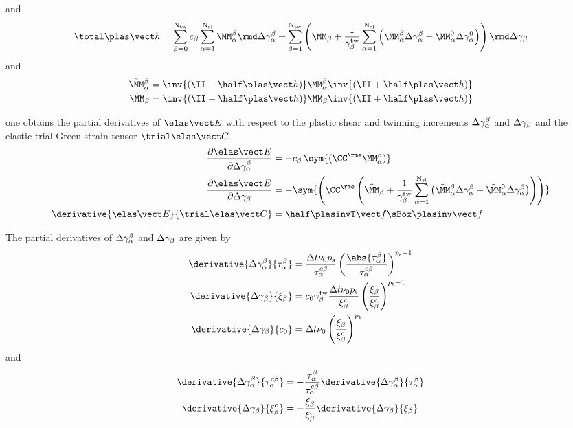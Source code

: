   and
  \begin{equation}
      \dhhp =  \sumbO \cb \sumaI \MMab \rmd \Delta \gammaab + \sumbI \left(\MMb + \frac{1}{\gammatwb}\sumaI\left(\MMab\Delta\gammaab-\MMaO\Delta\gammaaO\right)\right)  \rmd \Delta \gammab
      \label{eq:dhhp}
  \end{equation}
  and 
  \begin{equation}
    \begin{split}
      \MMabtilde = \inv{\IIminus} \MMab \inv{\IIplus} \\
      \MMbtilde = \inv{\IIminus} \MMb \inv{\IIplus}
    \end{split}
  \end{equation}
  
  one obtains the partial derivatives of $\EEe$ with respect to the plastic shear and twinning increments $\Delta\gamma^{\beta}_{\alpha}$ and $\Delta\gamma_{\beta}$ and the elastic trial Green strain tensor $\CCetr$
  \begin{align}
    \dEEeDDeltagammaab &= - \cb \, \sym{(\CCe \MMabtilde)} \label{eq:dEEeDDeltagammaab}\\
    \dEEeDDeltagammab &= - \sym{\left(\CCe \left(\MMbtilde+\frac{1}{\gammatwb}\sumaI \left(\MMabtilde\Delta\gammaab-\MMaOtilde\Delta\gammaab\right)\right)\right)} \label{eq:dEEeDDeltagammab}\\
    \derivative{\EEe}{\CCetr} &= \half \ffpinvT \sBox \ffpinv
  \end{align}
  
  The partial derivatives of $\Delta\gamma^{\beta}_{\alpha}$ and $\Delta\gamma_{\beta}$ are given by 
  \begin{align}
    \derivative{\Delta\gammaab}{\tauab} &= \frac{\Dt \nu_0 \psl}{\tauacb} \left(\frac{\abs{\tauab}}{\tauacb} \right)^{\psl-1} \\
    \derivative{\Delta\gammab}{\xib} &= c_0 \gammatwb \frac{\Dt \nu_0 \ptw}{\xibc} \left(\frac{\xib}{\xibc} \right)^{\ptw-1} \\
    \derivative{\Delta\gammab}{c_0} &= \Dt \nu_0 \left(\frac{\xib}{\xibc} \right)^{\ptw}
  \end{align}
  and
  \begin{align}
    \derivative{\Delta\gammaab}{\tauacb} &= - \frac{\tauab}{\tauacb} \derivative{\Delta\gammaab}{\tauab} \\
    \derivative{\Delta\gammab}{\xibc} &= -\frac{\xib}{\xibc} \derivative{\Delta\gammab}{\xib}
  \end{align}
  
